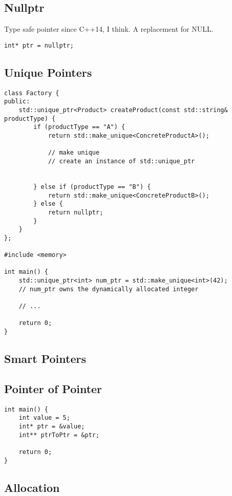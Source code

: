\documentclass[openany]{report}
\begin{document}
\subsection{Nullptr}

Type safe pointer since C++14, I think. A replacement for NULL.

\begin{verbatim}
int* ptr = nullptr;
\end{verbatim}


\subsection{Unique Pointers}

\begin{verbatim}
class Factory {
public:
    std::unique_ptr<Product> createProduct(const std::string& productType) {
        if (productType == "A") {
            return std::make_unique<ConcreteProductA>();

            // make unique
            // create an instance of std::unique_ptr


        } else if (productType == "B") {
            return std::make_unique<ConcreteProductB>();
        } else {
            return nullptr;
        }
    }
};

#include <memory>

int main() {
    std::unique_ptr<int> num_ptr = std::make_unique<int>(42);
    // num_ptr owns the dynamically allocated integer

    // ...
    
    return 0;
}

\end{verbatim}

\subsection{Smart Pointers}

\subsection{Pointer of Pointer}

\begin{verbatim}
int main() {
    int value = 5;
    int* ptr = &value;
    int** ptrToPtr = &ptr;

    return 0;
}
\end{verbatim}

\subsection{Allocation}
\end{document}
